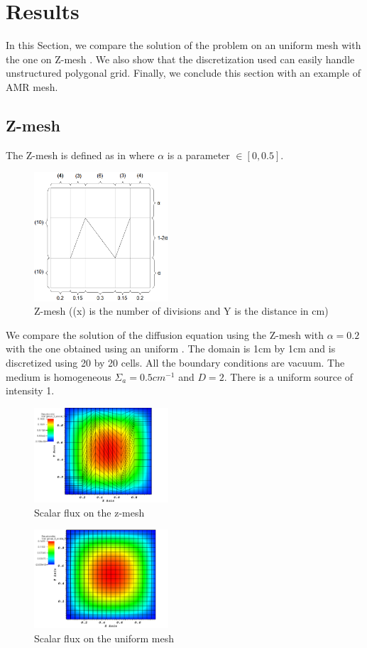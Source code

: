 \section{Results} \label{sec_results}
In this Section, we compare the solution of the problem on an uniform mesh
with the one on Z-mesh \cite{Stone2003}. We also show that the
discretization used can easily handle unstructured polygonal grid. Finally, we
conclude this section with an example of AMR mesh.
\subsection{Z-mesh}
The Z-mesh is defined as in  where $\alpha$ is a parameter
$\in [0,0.5]$. 
\begin{figure}[H]
  \centering
  \includegraphics[width=5cm]{z_mesh}
  \caption{Z-mesh ((x) is the number of divisions and Y is the distance in cm)}
  \label{fig_z_mesh}
\end{figure}    
We compare the solution of the diffusion equation using the Z-mesh
 with $\alpha=0.2$ with the one obtained using an uniform . 
The domain is 1cm by 1cm and is discretized using 20 by 20 cells. All the 
boundary conditions are vacuum. The medium is homogeneous $\Sigma_a = 0.5 cm^{-1}$ 
and $D=2$. There is a uniform source of intensity 1.                  
\begin{figure}[H]
  \centering
  \includegraphics[width=5cm]{z_mesh_sol}
  \caption{Scalar flux on the z-mesh}
  \label{z_mesh_sol}
\end{figure}
\begin{figure}[H]
  \centering
  \includegraphics[width=5cm]{pwld_uniform_sol}
  \caption{Scalar flux on the uniform mesh}
  \label{u_mesh_sol}
\end{figure}
